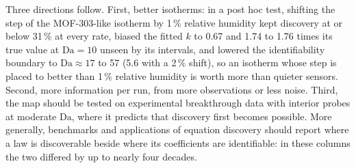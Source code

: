 \documentclass[11pt]{article}
\newcommand{\Da}{\mathrm{Da}}
\begin{document}

Three directions follow. First, better isotherms: in a post hoc test, shifting the step of the
MOF-303-like isotherm by 1\,\% relative humidity kept discovery at or below 31\,\% at every rate,
biased the fitted $k$ to 0.67 and 1.74 to 1.76 times its true value at $\Da = 10$ unseen by its intervals, and lowered the identifiability boundary to $\Da \approx 17$ to 57 (5.6 with a 2\,\% shift),
so an isotherm whose step is placed to better than 1\,\% relative humidity is worth more than quieter
sensors. Second, more information per run, from more observations or less noise. Third, the map should be tested on experimental breakthrough data with interior
probes at moderate $\Da$, where it predicts that discovery first becomes possible. More generally,
benchmarks and applications of equation discovery should report where a law is discoverable beside
where its coefficients are identifiable: in these columns the two differed by up to nearly four decades.
\end{document}
